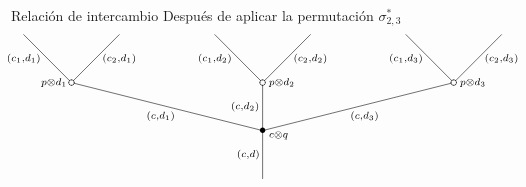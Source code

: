 \documentclass[12pt,aspectratio=169]{beamer}
\numberwithin{equation}{section}
\theoremstyle{definition}
\begin{document}
\begin{frame}{Relaci\'on de intercambio}
    Despu\'es de aplicar la permutaci\'on $\sigma_{2,3}^{*}$
        \begin{equation}
            \xy
            <0.08cm, 0cm>:
            (0.0, 0.0)*{}="1"; %
            (0.0, 15.0)*=0{\bullet}="2"; %
            (-60.0, 30.0)*\cir<2pt>{}="3"; %
            (-75.0, 45.0)*{}="4"; %
            (-45.0, 45.0)*{}="5"; %
            (0.0, 30.0)*\cir<2pt>{}="6"; %
            (-15.0, 45.0)*{}="7"; %
            (15.0, 45.0)*{}="8"; %
            (60.0, 30.0)*\cir<2pt>{}="9"; %
            (45.0, 45.0)*{}="10"; %
            (75.0, 45.0)*{}="11"; %
            "1";"2" **\dir{-};
            "2";"3" **\dir{-};
            "3";"4" **\dir{-};
            "3";"5" **\dir{-};
            "2";"6" **\dir{-};
            "6";"7" **\dir{-};
            "6";"8" **\dir{-};
            "2";"9" **\dir{-};
            "9";"10" **\dir{-};
            "9";"11" **\dir{-};
            (5.0, 13.5)*=0{\scriptstyle c\otimes q};
            (-65.5, 30.0)*=0{\scriptstyle p\otimes d_1};
            (6.0, 30.0)*=0{\scriptstyle p\otimes d_2};
            (66, 30.0)*=0{\scriptstyle p\otimes d_3};
            (-4.5, 7.5)*=0{\scriptstyle (c,d)};
            (-32.0, 19.5)*=0{\scriptstyle (c,d_1)};
            (-75, 37.5)*=0{\scriptstyle (c_1,d_1)};
            (-45, 37.5)*=0{\scriptstyle (c_2,d_1)};
            (-5.5, 22.5)*=0{\scriptstyle (c,d_2)};
            (-15, 37.5)*=0{\scriptstyle (c_1,d_2)};
            (15, 37.5)*=0{\scriptstyle (c_2,d_2)};
            (32.0, 19.5)*=0{\scriptstyle (c,d_3)};
            (45, 37.5)*=0{\scriptstyle (c_1,d_3)};
            (75, 37.5)*=0{\scriptstyle (c_2,d_3)};
            \endxy
        \end{equation}
\end{frame}
\end{document}
